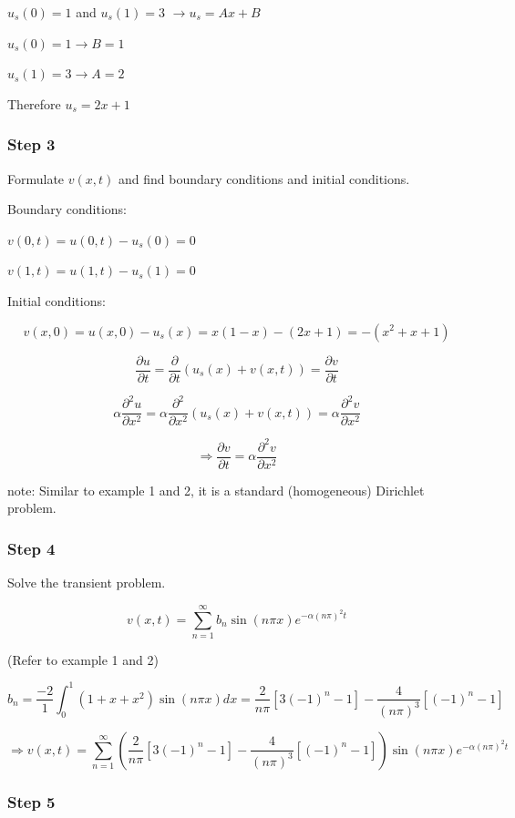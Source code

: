 $u_s(0) = 1$ and $u_s(1) = 3$ $\rightarrow u_s = A x + B$

$u_s(0) = 1 \rightarrow B = 1$

$u_s(1) = 3 \rightarrow A = 2$

Therefore $u_s = 2 x + 1$

\subsubsection{Step 3}

Formulate $v(x,t)$ and find boundary conditions and initial conditions. 

Boundary conditions:

$v(0,t) = u(0,t) - u_s(0) = 0$

$v(1,t) = u(1,t) - u_s(1) = 0$

Initial conditions:

$$v(x,0) = u(x,0) - u_s(x) = x(1-x) - (2x+1) = -(x^2 + x + 1)$$

$$\frac{\partial u}{\partial t} = \frac{\partial}{\partial t} \left( u_s (x) + v(x,t) \right) = \frac{\partial v}{\partial t}$$

$$\alpha \frac{\partial^2 u}{\partial x^2} = \alpha \frac{\partial^2}{\partial x^2} \left( u_s (x) + v(x,t) \right) = \alpha \frac{\partial^2 v}{\partial x^2}$$

$$\Rightarrow \frac{\partial v}{\partial t} = \alpha \frac{\partial^2 v}{\partial x^2}$$

note: Similar to example 1 and 2, it is a standard (homogeneous) Dirichlet problem. 

\subsubsection{Step 4}

Solve the transient problem. 

$$v(x,t) = \sum_{n = 1}^\infty b_n \sin(n \pi x) e^{-\alpha (n \pi)^2 t}$$

(Refer to example 1 and 2)

$$b_n = \frac{-2}{1} \int_0^1 (1 + x + x^2) \sin(n \pi x) dx = \frac{2}{n \pi} \left[ 3(-1)^n - 1 \right] - \frac{4}{(n \pi)^3} \left[(-1)^n - 1 \right]$$

$$\Rightarrow v(x,t) = \sum_{n = 1}^\infty \left( \frac{2}{n \pi} \left[ 3(-1)^n - 1 \right] - \frac{4}{(n \pi)^3} \left[(-1)^n - 1 \right] \right) \sin(n \pi x) e^{-\alpha (n \pi)^2 t}$$

\subsubsection{Step 5}

